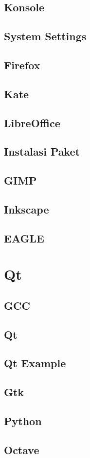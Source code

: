 \documentclass[11pt,fleqn]{book} %
\begin{document}
\section{Konsole}
\section{System Settings}
\section{Firefox}
\section{Kate}
\section{LibreOffice}
\section{Instalasi Paket}
\section{GIMP}
\section{Inkscape}
\section{EAGLE}

\newpage
{} %
\chapter{Qt}
\section{GCC}
\section{Qt}
\section{Qt Example}
\section{Gtk}
\section{Python}
\section{Octave}
\end{document}
